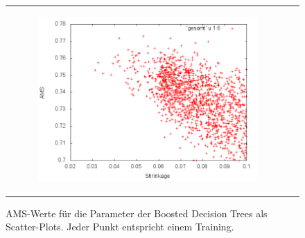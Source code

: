 \begin{figure}[!t]
\begin{tabular}[b]{cc}
  	  \begin{subfigure}[b]{0.5\linewidth}
	   	\includegraphics[width=\linewidth]{sections/parameter_optimization_bdt/Shrinkage.png}
 		\caption[]{}
		\label{fig:bdt_Shrinkage}
  	  \end{subfigure} &
  \end{tabular}
  \caption[AMS-Werte für die Parameter der Boosted Decision Trees]{AMS-Werte für die Parameter der Boosted Decision Trees als Scatter-Plots. Jeder Punkt entspricht einem Training.}
  \label{AMS-distribution-plots}
\end{figure}